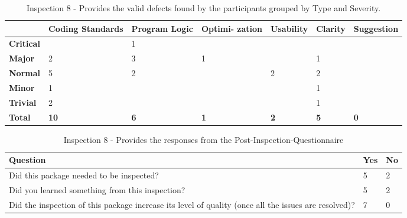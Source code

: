 \begin{table}[!h]
  \begin{center}
    \caption[Inspection 8 - Results by Type and Severity]{Inspection 8 -
      Provides the valid defects found by the participants grouped by Type
      and Severity.}
    \label{tab:inspection-results-8-type}
    \begin{tabular}{|p{2.0cm}|p{1.7cm}|p{1.5cm}|p{1.7cm}|p{1.4cm}|p{1.4cm}|p{1.5cm}|}  \hline   
\small{} & \small{}{\bf Coding Standards} & 
\small{}{\bf Program Logic} & \small{} {\bf Optimi- zation} & 
\small{}{\bf Usability} & \small{} {\bf Clarity} & 
\small{} {\bf Suggestion} \\ \hline

{\bf Critical} &   & 1 &   &   &   &   \\ \hline
{\bf Major}    & 2 & 3 & 1 &   & 1 &   \\ \hline
{\bf Normal}   & 5 & 2 &   & 2 & 2 &   \\ \hline
{\bf Minor}    & 1 &   &   &   & 1 &   \\ \hline
{\bf Trivial}  & 2 &   &   &   & 1 &   \\ \hline

{\bf Total} & {\bf 10} & {\bf 6} & {\bf 1} & {\bf 2} & {\bf 5} & {\bf 0} \\ \hline
    \end{tabular}
  \end{center}
\end{table}

\begin{table}[!h]
  \begin{center}
    \caption[Post Inspection 8 - Responses]{Inspection 8 - Provides the
      responses from the Post-Inspection-Questionnaire}
    \label{tab:post-inspection-questionnaire-results-8}
    \begin{tabular}{|p{8.0cm}|p{2.5cm}|p{2.5cm}|} \hline
{\bf Question} & {\bf Yes} & {\bf No} \\ \hline
Did this package needed to be inspected?  & 5 & 2 \\ \hline
Did you learned something from this inspection?  & 5 & 2 \\ \hline
Did the inspection of this package increase its level of quality (once all
the issues are resolved)? & 7 & 0 \\ \hline
    \end{tabular}
  \end{center}
\end{table}





